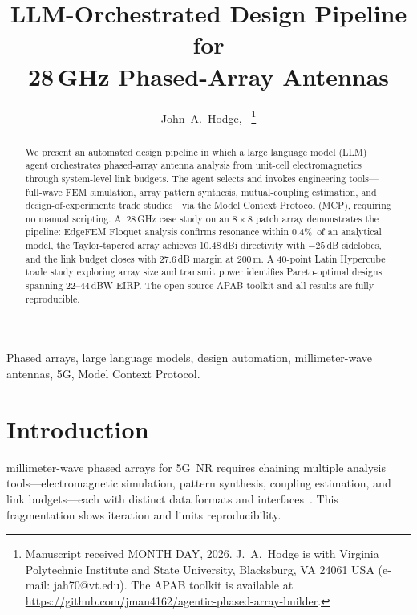 \documentclass[journal]{IEEEtran}
\begin{document}
\title{LLM-Orchestrated Design Pipeline for\\28\,GHz Phased-Array Antennas}

\author{John~A.~Hodge,~
\thanks{Manuscript received MONTH DAY, 2026.
J.~A.~Hodge is with Virginia Polytechnic Institute and State University,
Blacksburg, VA 24061 USA (e-mail: jah70@vt.edu).
The APAB toolkit is available at
\protect\url{https://github.com/jman4162/agentic-phased-array-builder}.}}

\maketitle

\begin{abstract}
We present an automated design pipeline in which a large language model
(LLM) agent orchestrates phased-array antenna analysis from unit-cell
electromagnetics through system-level link budgets. The agent selects and
invokes engineering tools---full-wave FEM simulation, array pattern
synthesis, mutual-coupling estimation, and design-of-experiments trade
studies---via the Model Context Protocol (MCP), requiring no manual
scripting. A~28\,GHz case study on an $8\times8$ patch array demonstrates
the pipeline: EdgeFEM Floquet analysis confirms resonance within 0.4\%\ of
an analytical model, the Taylor-tapered array achieves 10.48\,dBi
directivity with $-25$\,dB sidelobes, and the link budget closes with
27.6\,dB margin at 200\,m. A 40-point Latin Hypercube trade study
exploring array size and transmit power identifies Pareto-optimal designs
spanning 22--44\,dBW EIRP. The open-source APAB toolkit and all results
are fully reproducible.
\end{abstract}

\begin{IEEEkeywords}
Phased arrays, large language models, design automation, millimeter-wave
antennas, 5G, Model Context Protocol.
\end{IEEEkeywords}

\section{Introduction}

 millimeter-wave phased arrays for 5G~NR
requires chaining multiple analysis tools---electromagnetic simulation,
pattern synthesis, coupling estimation, and link budgets---each with
distinct data formats and interfaces~\cite{balanis2016,mailloux2017}.
This fragmentation slows iteration and limits reproducibility.
\end{document}
